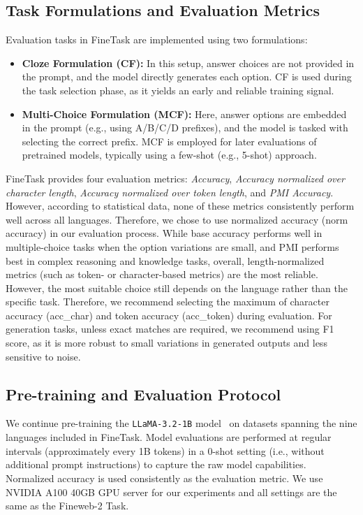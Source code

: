 \subsection{Task Formulations and Evaluation Metrics}
Evaluation tasks in FineTask are implemented using two formulations:
\begin{itemize}
    \item \textbf{Cloze Formulation (CF):} In this setup, answer choices are not provided in the prompt, and the model directly generates each option. CF is used during the task selection phase, as it yields an early and reliable training signal.
    \item \textbf{Multi-Choice Formulation (MCF):} Here, answer options are embedded in the prompt (e.g., using A/B/C/D prefixes), and the model is tasked with selecting the correct prefix. MCF is employed for later evaluations of pretrained models, typically using a few-shot (e.g., 5-shot) approach.
\end{itemize}
    

FineTask provides four evaluation metrics: \textit{Accuracy}, \textit{Accuracy normalized over character length}, \textit{Accuracy normalized over token length}, and \textit{PMI Accuracy}.
However, according to statistical data, none of these metrics consistently perform well across all languages.
Therefore, we chose to use normalized accuracy (norm accuracy) in our evaluation process.
While base accuracy performs well in multiple-choice tasks when the option variations are small, and PMI performs best in complex reasoning and knowledge tasks, overall, length-normalized metrics (such as token- or character-based metrics) are the most reliable.
However, the most suitable choice still depends on the language rather than the specific task.
Therefore, we recommend selecting the maximum of character accuracy (acc\_char) and token accuracy (acc\_token) during evaluation.
For generation tasks, unless exact matches are required, we recommend using F1 score, as it is more robust to small variations in generated outputs and less sensitive to noise.

\subsection{Pre-training and Evaluation Protocol}
We continue pre-training the \texttt{LLaMA-3.2-1B} model~\cite{dubey2024llama} on datasets spanning the nine languages included in FineTask. Model evaluations are performed at regular intervals (approximately every 1B tokens) in a 0-shot setting (i.e., without additional prompt instructions) to capture the raw model capabilities. Normalized accuracy is used consistently as the evaluation metric.
We use NVIDIA A100 40GB GPU server for our experiments and all settings are the same as the Fineweb-2 Task.



